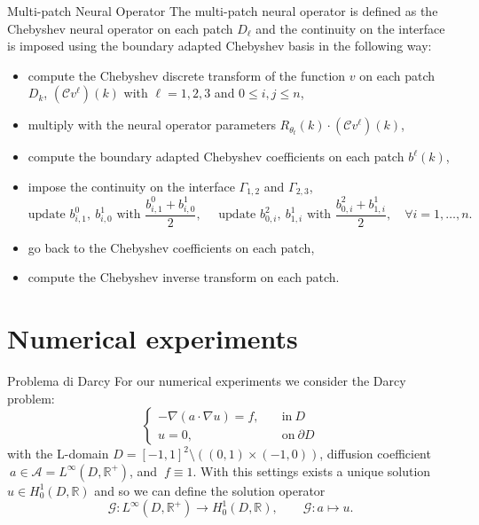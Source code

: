 \documentclass{beamer}
\newcommand{\numberset}{\mathbb}
\newcommand{\R}{\numberset{R}}
\begin{document}
\begin{frame}{Multi-patch Neural Operator}
The multi-patch neural operator is defined as the Chebyshev neural operator on each patch $D_\ell$ and the continuity on the interface is imposed using the boundary adapted Chebyshev basis in the following way:
\begin{itemize}
	\item compute the Chebyshev discrete transform of the function $v$ on each patch $D_k$, $(\mathcal{C}v^{\ell})(k)$ with $\ell=1,2,3$ and $0 \le i,j \le n$,
	\item multiply with the neural operator parameters $R_{\theta_t}(k) \cdot (\mathcal{C}v^{\ell})(k)$,
	\item compute the boundary adapted Chebyshev coefficients on each patch $b^{\ell}(k)$,
	\item impose the continuity on the interface $\Gamma_{1,2}$ and $\Gamma_{2,3}$,
	\[ \text{update } b^{0}_{i, 1},\ b^{1}_{i,0} \text{ with } \frac{b^{0}_{i, 1} + b^{1}_{i,0}}{2}, \quad  \text{ update } b^{2}_{0,i}, \ b^{1}_{1, i} \text{ with } \frac{b^{2}_{0,i} + b^{1}_{1, i}}{2}, \quad \forall i = 1, \dots, n.\]
	\item go back to the Chebyshev coefficients on each patch,
	\item compute the Chebyshev inverse transform on each patch.
\end{itemize}

\end{frame}


\section{Numerical experiments}


\begin{frame}{Problema di Darcy}
	For our numerical experiments we consider the Darcy problem:
	\[ 	\begin{cases}
		- \nabla(a \cdot \nabla u) = f,\quad &  \mathrm{in}\ D\\
		u = 0, & \mathrm{on} \ \partial D
	\end{cases} \]
	with the L-domain $ D = [-1, 1]^2\setminus ((0,1)\times (-1,0)) $, diffusion coefficient $\ a \in \mathcal{A} = L^{\infty}(D, \R^+) $,  and $\ f \equiv 1 $. With this settings exists a unique solution $ u \in H^1_0(D, \R) $ and so we can define the solution operator 
	\[  \mathcal{G}: L^{\infty}(D, \R^+) \to H^1_0(D, \R), \qquad \mathcal{G}:a \mapsto u. \]
\end{frame}
\end{document}
